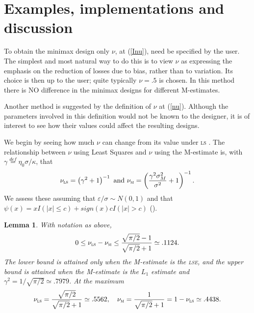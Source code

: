 \documentclass[times, authoryear, 12pt, twoside]{elsarticle}
\newtheorem{lemma}{Lemma}
\begin{document}
\section{Examples, implementations and discussion \label{section: examples}}

To obtain the minimax design only $\nu $, at (\ref{Inu}), need be specified
by the user. The simplest and most natural way to do this is to view $\nu $
as expressing the emphasis on the reduction of losses due to bias, rather
than to variation. Its choice is then up to the user; quite typically $\nu
=.5$ is chosen. In this method there is NO difference in the minimax designs
for different M-estimates.

Another method is suggested by the definition of $\nu $ at (\ref{nu}).
Although the parameters involved in this definition would not be known to
the designer, it is of interest to see how their values could affect the
resulting designs.

We begin by seeing how much $\nu $ can change from its value under \textsc{ls%
}. The relationship between $\nu $ using Least Squares and $\nu $ using the
M-estimate is, with $\gamma \overset{def}{=}\eta _{0}\sigma /\kappa $, that 
\begin{equation*}
\nu _{\text{\textsc{ls}}}=\left( \gamma ^{2}+1\right) ^{-1}\text{ and }\nu _{%
\text{\textsc{m}}}=\left( \frac{\gamma ^{2}\sigma _{M}^{2}}{\sigma ^{2}}%
+1\right) ^{-1}.
\end{equation*}%
We assess these assuming that $\varepsilon /\sigma \sim N(0,1)$ and that $%
\psi \left( x\right) =xI\left( \left\vert x\right\vert \leq c\right)
+sign(x)cI\left( \left\vert x\right\vert >c\right) $ (\cite{h64}).

\begin{lemma}
\label{lemma: maxdiff} With notation as above, 
\begin{equation*}
0\leq \nu _{\text{\textsc{ls}}}-\nu _{\text{\textsc{m}}}\leq \frac{\sqrt{\pi
/2}-1}{\sqrt{\pi /2}+1}\simeq .1124.
\end{equation*}%
The lower bound is attained only when the M-estimate is the \textsc{lse},
and the upper bound is attained when the M-estimate is the $L_{1}$ estimate
and $\gamma ^{2}=1/\sqrt{\pi /2}\simeq .7979$. At the maximum 
\begin{equation}
\nu _{\text{\textsc{ls}}}=\frac{\sqrt{\pi /2}}{\sqrt{\pi /2}+1}\simeq
.5562,\quad \nu _{\text{\textsc{m}}}=\frac{1}{\sqrt{\pi /2}+1}=1-\nu _{\text{%
\textsc{ls}}}\simeq .4438.  \label{nus}
\end{equation}
\end{lemma}
\end{document}
